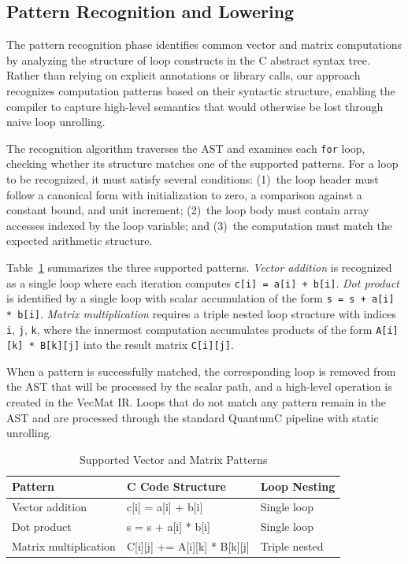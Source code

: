 \subsection{Pattern Recognition and Lowering}
\label{sec:pattern-lowering}


The pattern recognition phase identifies common vector and matrix computations by analyzing the structure of loop constructs in the C abstract syntax tree. Rather than relying on explicit annotations or library calls, our approach recognizes computation patterns based on their syntactic structure, enabling the compiler to capture high-level semantics that would otherwise be lost through naive loop unrolling.

The recognition algorithm traverses the AST and examines each \texttt{for} loop, checking whether its structure matches one of the supported patterns. For a loop to be recognized, it must satisfy several conditions: (1)~the loop header must follow a canonical form with initialization to zero, a comparison against a constant bound, and unit increment; (2)~the loop body must contain array accesses indexed by the loop variable; and (3)~the computation must match the expected arithmetic structure.

Table~\ref{tab:patterns} summarizes the three supported patterns. \emph{Vector addition} is recognized as a single loop where each iteration computes \texttt{c[i] = a[i] + b[i]}. \emph{Dot product} is identified by a single loop with scalar accumulation of the form \texttt{s = s + a[i] * b[i]}. \emph{Matrix multiplication} requires a triple nested loop structure with indices \texttt{i}, \texttt{j}, \texttt{k}, where the innermost computation accumulates products of the form \texttt{A[i][k] * B[k][j]} into the result matrix \texttt{C[i][j]}.

When a pattern is successfully matched, the corresponding loop is removed from the AST that will be processed by the scalar path, and a high-level operation is created in the VecMat IR. Loops that do not match any pattern remain in the AST and are processed through the standard QuantumC pipeline with static unrolling.

\begin{table}[!htb]
  \caption{Supported Vector and Matrix Patterns}
  \label{tab:patterns}
  \centering
  \small
  \setlength{\tabcolsep}{6pt}
  \begin{tabularx}{\linewidth}{l>{\ttfamily\raggedright\arraybackslash}X l}
    \toprule
    Pattern & C Code Structure & Loop Nesting \\
    \midrule
    Vector addition & c[i] = a[i] + b[i] & Single loop \\
    Dot product & s = s + a[i] * b[i] & Single loop \\
    Matrix multiplication & C[i][j] += A[i][k] * B[k][j] & Triple nested \\
    \bottomrule
  \end{tabularx}
\end{table}

